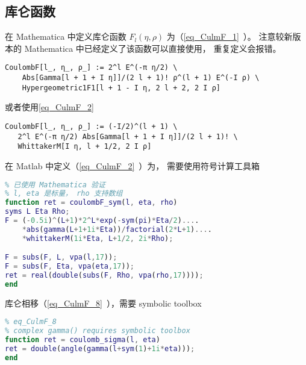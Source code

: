 


\subsection{库仑函数}
在 Mathematica 中定义库仑函数 $F_l(\eta, \rho)$ 为（\autoref{eq_CulmF_1}~）。 注意较新版本的 Mathematica 中已经定义了该函数可以直接使用， 重复定义会报错。
\begin{lstlisting}[language=mma] % 已验证
CoulombF[l_, η_, ρ_] := 2^l E^(-π η/2) \
    Abs[Gamma[l + 1 + I η]]/(2 l + 1)! ρ^(l + 1) E^(-I ρ) \
    Hypergeometric1F1[l + 1 - I η, 2 l + 2, 2 I ρ]
\end{lstlisting}
或者使用\autoref{eq_CulmF_2}~\upref{CulmF} %
\begin{lstlisting}[language=mma]
CoulombF[l_, η_, ρ_] := (-I/2)^(l + 1) \
   2^l E^(-π η/2) Abs[Gamma[l + 1 + I η]]/(2 l + 1)! \
   WhittakerM[I η, l + 1/2, 2 I ρ]
\end{lstlisting}

在 Matlab 中定义（\autoref{eq_CulmF_2}~\upref{CulmF}）为， 需要使用符号计算工具箱 %
\begin{lstlisting}[language=matlab, caption=coulombF\_sym.m]
% 第一类库仑函数 F_l(eta, rho)
% 已使用 Mathematica 验证
% l, eta 是标量， rho 支持数组
function ret = coulombF_sym(l, eta, rho)
syms L Eta Rho;
F = (-0.5i)^(L+1)*2^L*exp(-sym(pi)*Eta/2)....
    *abs(gamma(L+1+1i*Eta))/factorial(2*L+1)....
    *whittakerM(1i*Eta, L+1/2, 2i*Rho);

F = subs(F, L, vpa(l,17));
F = subs(F, Eta, vpa(eta,17));
ret = real(double(subs(F, Rho, vpa(rho,17))));
end
\end{lstlisting}

库仑相移（\autoref{eq_CulmF_8}~\upref{CulmF}），需要 symbolic toolbox
\begin{lstlisting}[language=matlab, caption=coulomb\_sigma.m]
% coulomb phase
% eq_CulmF_8
% complex gamma() requires symbolic toolbox
function ret = coulomb_sigma(l, eta)
ret = double(angle(gamma(l+sym(1)+1i*eta)));
end
\end{lstlisting}

